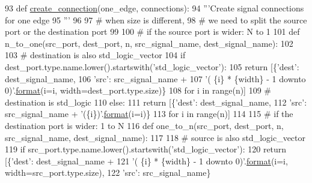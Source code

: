 \begin{DoxyCode}
93 \textcolor{keyword}{def }\hyperlink{namespacesylva_1_1code__generation_1_1hsdf__to__vhdl_a5381a4c2d460f5f0490d0361e37917e9}{create\_connection}(one\_edge, connections):
94     \textcolor{stringliteral}{'''Create signal connections for one edge}
95 \textcolor{stringliteral}{    '''}
96 
97     \textcolor{comment}{# when size is different,}
98     \textcolor{comment}{# we need to split the source port or the destination port}
99 
100     \textcolor{comment}{# if the source port is wider: N to 1}
101     \textcolor{keyword}{def }n\_to\_one(src\_port, dest\_port, n, src\_signal\_name, dest\_signal\_name):
102 
103         \textcolor{comment}{# destination is also std\_logic\_vector}
104         \textcolor{keywordflow}{if} dest\_port.type.name.lower().startswith(\textcolor{stringliteral}{'std\_logic\_vector'}):
105             \textcolor{keywordflow}{return} [\{\textcolor{stringliteral}{'dest'}: dest\_signal\_name,
106                      \textcolor{stringliteral}{'src'}: src\_signal\_name +
107                      \textcolor{stringliteral}{'( \{i\} * \{width\} - 1 downto 0)'}.\hyperlink{namespacesylva_1_1examples_1_1hsdfg_ab3510a0b8457362330aa4d9fd2209590}{format}(i=i, width=dest\_port.type.size)\}
108                     \textcolor{keywordflow}{for} i \textcolor{keywordflow}{in} range(n)]
109         \textcolor{comment}{# destination is std\_logic}
110         \textcolor{keywordflow}{else}:
111             \textcolor{keywordflow}{return} [\{\textcolor{stringliteral}{'dest'}: dest\_signal\_name,
112                      \textcolor{stringliteral}{'src'}: src\_signal\_name + \textcolor{stringliteral}{'(\{i\})'}.\hyperlink{namespacesylva_1_1examples_1_1hsdfg_ab3510a0b8457362330aa4d9fd2209590}{format}(i=i)\}
113                     \textcolor{keywordflow}{for} i \textcolor{keywordflow}{in} range(n)]
114 
115     \textcolor{comment}{# if the destination port is wider: 1 to N}
116     \textcolor{keyword}{def }one\_to\_n(src\_port, dest\_port, n, src\_signal\_name, dest\_signal\_name):
117 
118         \textcolor{comment}{# source is also std\_logic\_vector}
119         \textcolor{keywordflow}{if} src\_port.type.name.lower().startswith(\textcolor{stringliteral}{'std\_logic\_vector'}):
120             \textcolor{keywordflow}{return} [\{\textcolor{stringliteral}{'dest'}: dest\_signal\_name +
121                      \textcolor{stringliteral}{'( \{i\} * \{width\} - 1 downto 0)'}.\hyperlink{namespacesylva_1_1examples_1_1hsdfg_ab3510a0b8457362330aa4d9fd2209590}{format}(i=i, width=src\_port.type.size),
122                      \textcolor{stringliteral}{'src'}: src\_signal\_name\}

\end{DoxyCode}
